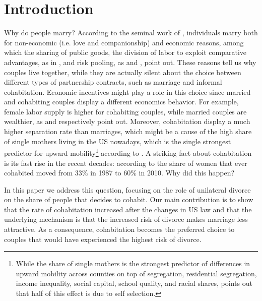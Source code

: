 \documentclass[12pt]{article}
\numberwithin{table}{section}
\begin{document}
\section{Introduction}
Why do people marry? According to the seminal work of \citet{becker1981}, individuals marry both for non-economic (i.e. love and companionship) and economic reasons, among which the sharing of public goods, the division of labor to exploit comparative advantages, as in \cite{chiappori1997}, and risk pooling, as \cite{voena2015} and \cite{rigas2015}, point out. These reasons tell us why couples live together, while they are actually silent about the choice between different types of partnership contracts, such as marriage and informal cohabitation. Economic incentives might play a role in this choice since married and cohabiting couples display a different economics behavior. For example, female labor supply is higher for cohabiting couples, while married couples are wealthier, as \cite{gemici2014} and \cite{lafortune2019} respectively point out. Moreover, cohabitation display a much higher separation rate than marriages, which might be a cause of the high share of single mothers living in the US nowadays, which is the single strongest predictor for upward mobility\footnote{While the share of single mothers is the strongest predictor of differences in upward mobility across counties on top of segregation, residential segregation, income inequality, social capital, school quality, and racial shares, \cite{chetty2018} points out that half of this effect is due to self selection.} according to \cite{chetty2018}. A striking fact about cohabitation is its fast rise in the recent decades: according to \cite{manning2013} the share of women that ever cohabited moved from 33\% in 1987 to 60\% in 2010. Why did this happen? 

In this paper we address this question, focusing on the role of unilateral divorce on the share of people that decides to cohabit. Our main contribution is to show that the rate of cohabitation increased after the changes in US law and that the underlying mechanism is that the increased risk of divorce makes marriage less attractive. As a consequence, cohabitation becomes the preferred choice to couples that would have experienced the highest risk of divorce.
\end{document}
